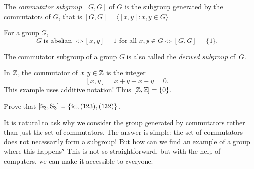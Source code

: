 \begin{definition}
        The \emph{commutator subgroup}
        $[G,G]$ of $G$ 
        is the subgroup generated by 
        the commutators of $G$, that is 
        $[G,G]=\langle[x,y]: x,y\in G\rangle$. 
\end{definition}

For a group $G$, 
\[
G\text{ is abelian }
\Longleftrightarrow [x,y]=1\text{ for all $x,y\in G$}
\Longleftrightarrow [G,G]=\{1\}.
\]

The commutator subgroup of a group $G$ is also called the \emph{derived subgroup} of~$G$. 
       
\begin{example}
        In $\mathbb{Z}$, the commutator of $x,y\in \mathbb{Z}$ 
        is the integer
        \[
        [x,y]=x+y-x-y=0.
        \]
        This example uses additive notation! 
        Thus $[\mathbb{Z},\mathbb{Z}]=\{0\}$. 
\end{example}
        
\begin{exercise}
        Prove that $[\mathbb{S}_3,\mathbb{S}_3]=\{\operatorname{id},(123),(132)\}$.
\end{exercise}
        
It is natural to ask why we consider the group generated by commutators rather than just the set of commutators. The answer is simple: the set of commutators does not necessarily form a subgroup! But how can we find an example of a group where this happens? This is not so straightforward, but with the help of computers, we can make it accessible to everyone.

